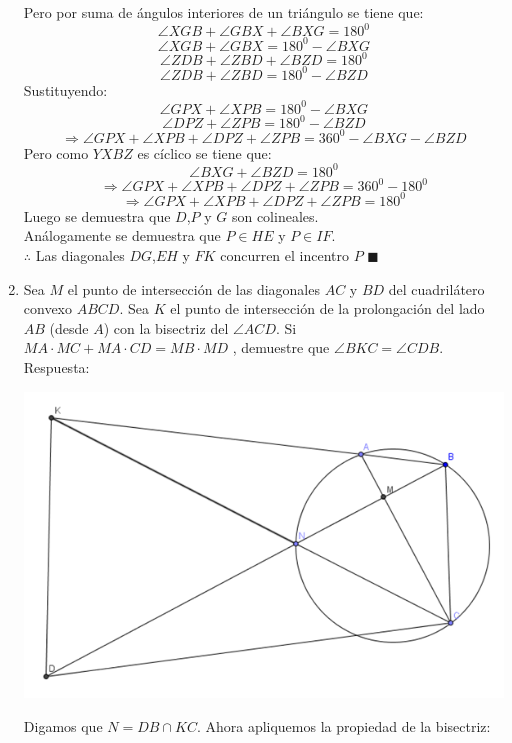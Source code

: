 \documentclass{book}
\begin{document}
\begin{enumerate}
          Pero por suma de ángulos interiores de un triángulo se tiene que:
          $$\angle XGB+\angle GBX+\angle BXG=180^0$$
          $$\angle XGB+\angle GBX=180^0-\angle BXG$$
          $$\angle ZDB+\angle ZBD+\angle BZD=180^0$$
          $$\angle ZDB+\angle ZBD=180^0-\angle BZD$$
          Sustituyendo:
          $$\angle GPX+\angle XPB=180^0-\angle BXG$$
          $$\angle DPZ+\angle ZPB=180^0-\angle BZD$$
          $$\Rightarrow\angle GPX+\angle XPB+\angle DPZ+\angle ZPB=360^0-\angle BXG-\angle BZD$$
          Pero como $YXBZ$ es cíclico se tiene que:
          $$\angle BXG+\angle BZD=180^0$$
          $$\Rightarrow\angle GPX+\angle XPB+\angle DPZ+\angle ZPB=360^0-180^0$$
          $$\Rightarrow\angle GPX+\angle XPB+\angle DPZ+\angle ZPB=180^0$$
          Luego se demuestra que $D$,$P$ y $G$ son colineales.\\
          Análogamente se demuestra que  $P\in HE$ y $P\in IF$.\\
          $\therefore$ Las diagonales $DG$,$EH$ y $FK$ concurren el incentro $P$ $\blacksquare$\\
    \item Sea $M$ el punto de intersección de las diagonales $AC$ y $BD$ del cuadrilátero convexo $ABCD$. Sea $K$ el punto de intersección de la prolongación del lado $AB$ (desde $A$) con la bisectriz del $\angle ACD$. Si $MA\cdot MC + MA\cdot CD =MB \cdot MD$ , demuestre que $\angle BKC = \angle CDB$. \\
          Respuesta:
          \begin{center}
              \includegraphics[scale=1]{imagenes/Geometria/11.png}
          \end{center}
          Digamos que $N=DB\cap KC$. Ahora apliquemos la propiedad de la bisectriz:

\end{enumerate}
\end{document}

